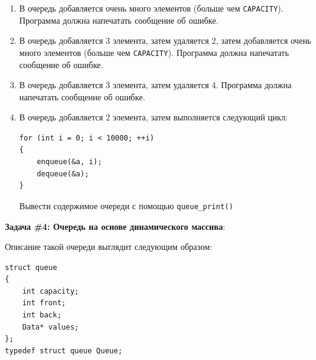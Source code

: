 \documentclass{article}
\begin{document}
\begin{enumerate}
\begin{enumerate}
\item В очередь добавляется очень много элементов (больше чем \texttt{CAPACITY}). Программа должна напечатать сообщение об ошибке.
\item В очередь добавляется 3 элемента, затем удаляется 2, затем добавляется очень много элементов (больше чем \texttt{CAPACITY}). Программа должна напечатать сообщение об ошибке.
\item В очередь добавляется 3 элемента, затем удаляется 4. Программа должна напечатать сообщение об ошибке.
\item В очередь добавляется 2 элемента, затем выполняется следующий цикл:
\begin{verbatim}
for (int i = 0; i < 10000; ++i)
{
    enqueue(&a, i);
    dequeue(&a);
}
\end{verbatim}
Вывести содержимое очереди с помощью \texttt{queue\_print()}
\end{enumerate}
\end{enumerate}

\textbf{Задача \#4: Очередь на основе динамического массива}:

Описание такой очереди выглядит следующим образом:
\begin{lstlisting}
struct queue
{
    int capacity;
    int front;
    int back;
    Data* values;
};
typedef struct queue Queue;
\end{lstlisting}
\end{document}
